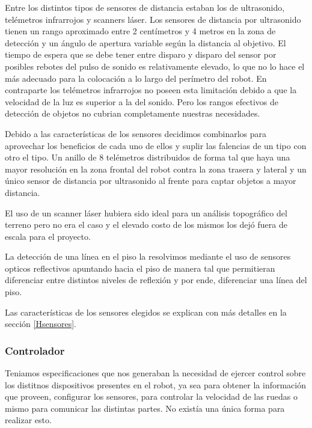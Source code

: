 Entre los distintos tipos de sensores de distancia estaban los de ultrasonido, tel\'emetros infrarrojos y scanners l\'aser. Los sensores de distancia
por ultrasonido tienen un rango aproximado entre 2 cent\'imetros y 4 metros en la zona de detecci\'on y un \'angulo de apertura variable seg\'un la
distancia al objetivo. El tiempo de espera que se debe tener entre disparo y disparo del sensor por posibles rebotes del pulso de sonido es
relativamente elevado, lo que no lo hace el m\'as adecuado para la colocaci\'on a lo largo del per\'imetro del robot. En contraparte los tel\'emetros
infrarrojos no poseen esta limitaci\'on debido a que la velocidad de la luz es superior a la del sonido. Pero los rangos efectivos de detecci\'on
de objetos no cubrian completamente nuestras necesidades.

Debido a las caracter\'isticas de los sensores decidimos combinarlos para aprovechar los beneficios de cada uno de ellos y suplir las falencias
de un tipo con otro el tipo. Un anillo de 8 tel\'emetros distribuidos de forma tal que haya una mayor resoluci\'on en la zona frontal del robot
contra la zona trasera y lateral y un \'unico sensor de distancia por ultrasonido al frente para captar objetos a mayor distancia.

El uso de un scanner l\'aser hubiera sido ideal para un an\'alisis topogr\'afico del terreno pero no era el caso y el elevado costo de los mismos los
dej\'o fuera de escala para el proyecto.

La detecci\'on de una l\'inea en el piso la resolvimos mediante el uso de sensores opticos reflectivos apuntando hacia el piso de manera tal que
permitieran diferenciar entre distintos niveles de reflexi\'on y por ende, diferenciar una l\'inea del piso.

Las caracter\'isticas de los sensores elegidos se explican con m\'as detalles en la secci\'on \ref{Hsensores}.

\subsubsection{Controlador}

Teniamos especificaciones que nos generaban la necesidad de ejercer control sobre los distitnos dispositivos presentes en el robot, ya sea para
obtener la informaci\'on que proveen, configurar los sensores, para controlar la velocidad de las ruedas o mismo para comunicar las distintas partes.
No exist\'ia una \'unica forma para realizar esto.

